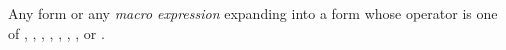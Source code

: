 \begin{optDefinition}
\begin{definitions}

     Any form or any
    {\em macro expression} expanding into a form whose operator is one of
    , , ,
    , , ,
    , or .


\end{definitions}
\end{optDefinition}
